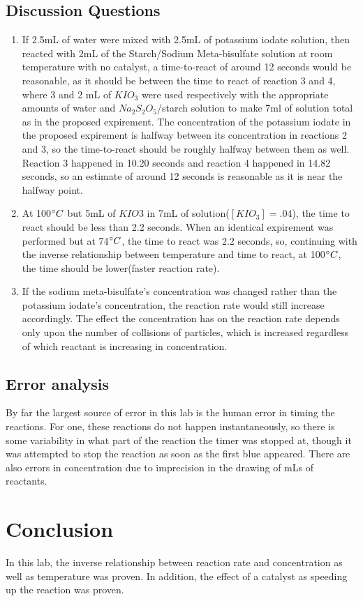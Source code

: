 \documentclass{article}
\begin{document}
\subsection{Discussion Questions}
\begin{enumerate}
    \item If 2.5mL of water were mixed with 2.5mL of potassium iodate solution, then reacted with 2mL of the Starch/Sodium Meta-bisulfate solution at room temperature with no catalyst, a time-to-react of  around 12 seconds would be reasonable, as it should be between the time to react of reaction 3 and 4, where 3 and 2 mL of $KIO_3$ were used respectively with the appropriate amounts of water and $Na_2S_2O_5$/starch solution to make 7ml of solution total as in the proposed expirement. The concentration of the potassium iodate in the proposed expirement is halfway between its concentration in reactions 2 and 3, so the time-to-react should be roughly halfway between them as well. Reaction 3 happened in 10.20 seconds and reaction 4 happened in 14.82 seconds, so an estimate of around 12 seconds is reasonable as it is near the halfway point.
    \item At 100$\degree C$ but 5mL of $KIO3$ in 7mL of solution($[KIO_3] = .04$), the time to react should be less than 2.2 seconds.  When an identical expirement was performed but at 74$\degree C$, the time to react was 2.2 seconds, so, continuing with the inverse relationship between temperature and time to react, at 100$\degree C$, the time should be lower(faster reaction rate).
    \item If the sodium meta-bisulfate's concentration was changed rather than the potassium iodate's concentration, the reaction rate would still increase accordingly.  The effect the concentration has on the reaction rate depends only upon the number of collisions of particles, which is increased regardless of which reactant is increasing in concentration.
\end{enumerate}
\subsection{Error analysis}
By far the largest source of error in this lab is the human error in timing the reactions.  For one, these reactions do not happen instantaneously, so there is some variability in what part of the reaction the timer was stopped at, though it was attempted to stop the reaction as soon as the first blue appeared.  There are also errors in concentration due to imprecision in the drawing of mLs of reactants.
\section{Conclusion}
In this lab, the inverse relationship between reaction rate and concentration as well as temperature was proven.  In addition, the effect of a catalyst as speeding up the reaction was proven.  
\end{document}
